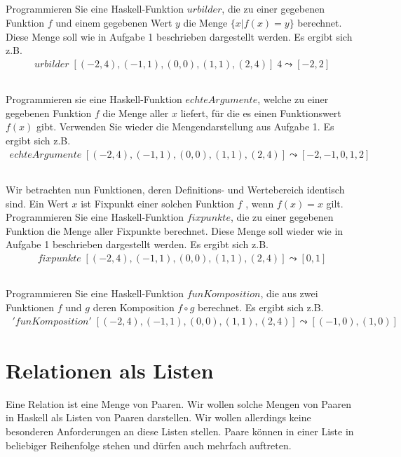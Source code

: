 \documentclass{article}
\begin{document}
\subsection{}
Programmieren Sie eine Haskell-Funktion $urbilder$, die zu einer gegebenen Funktion
$f$ und einem gegebenen Wert $y$ die Menge $\{x | f(x) = y\}$ berechnet. Diese Menge
soll wie in Aufgabe 1 beschrieben dargestellt werden. Es ergibt sich z.B.
\begin{align*}
urbilder\; [(-2, 4), (-1, 1), (0, 0), (1, 1), (2, 4)]\; 4 \leadsto [-2, 2] 
\end{align*}
\subsection{}
Programmieren sie eine Haskell-Funktion $echteArgumente$, welche zu einer gegebenen
Funktion $f$ die Menge aller $x$ liefert, für die es einen Funktionswert $f(x)$ gibt.
Verwenden Sie wieder die Mengendarstellung aus Aufgabe 1. Es ergibt sich z.B.
\begin{align*}
echteArgumente\; [(-2, 4), (-1, 1), (0, 0), (1, 1), (2, 4)] \leadsto [-2,-1, 0, 1, 2]
\end{align*}
\subsection{}
Wir betrachten nun Funktionen, deren Definitions- und Wertebereich identisch sind.
Ein Wert $x$ ist Fixpunkt einer solchen Funktion $f$ , wenn $f(x) = x$ gilt. Programmieren
Sie eine Haskell-Funktion $fixpunkte$, die zu einer gegebenen Funktion die Menge
aller Fixpunkte berechnet. Diese Menge soll wieder wie in Aufgabe 1 beschrieben
dargestellt werden. Es ergibt sich z.B.
\begin{align*}
fixpunkte \;[(-2, 4), (-1, 1), (0, 0), (1, 1), (2, 4)] \leadsto [0, 1]
\end{align*}
\subsection{}
Programmieren Sie eine Haskell-Funktion $funKomposition$, die aus zwei Funktionen
$f$ und $g$ deren Komposition $f \circ g$ berechnet. Es ergibt sich z.B.
\begin{align*}
[(1, 0), (2, 1)] \;'funKomposition' \;[(-2, 4), (-1, 1), (0, 0), (1, 1), (2, 4)] \leadsto [(-1, 0), (1, 0)]
\end{align*}

\section{Relationen als Listen}
Eine Relation ist eine Menge von Paaren. Wir wollen solche Mengen von Paaren in Haskell
als Listen von Paaren darstellen. Wir wollen allerdings keine besonderen Anforderungen
an diese Listen stellen. Paare können in einer Liste in beliebiger Reihenfolge stehen und
dürfen auch mehrfach auftreten.\\	
\end{document}

